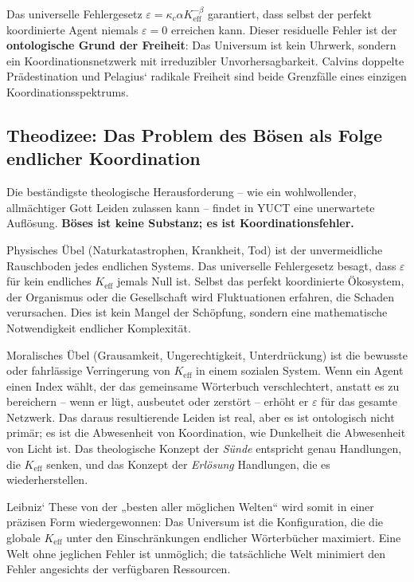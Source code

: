\documentclass[12pt,a4paper]{article}
\begin{document}
	Das universelle Fehlergesetz \(\varepsilon = \kappa_c \alpha K_{\mathrm{eff}}^{-\beta}\) garantiert, dass selbst der perfekt koordinierte Agent niemals \(\varepsilon = 0\) erreichen kann. Dieser residuelle Fehler ist der \textbf{ontologische Grund der Freiheit}: Das Universum ist kein Uhrwerk, sondern ein Koordinationsnetzwerk mit irreduzibler Unvorhersagbarkeit. Calvins doppelte Prädestination und Pelagius‘ radikale Freiheit sind beide Grenzfälle eines einzigen Koordinationsspektrums.
	
	\subsection{Theodizee: Das Problem des Bösen als Folge endlicher Koordination}
	
	Die beständigste theologische Herausforderung – wie ein wohlwollender, allmächtiger Gott Leiden zulassen kann – findet in YUCT eine unerwartete Auflösung. \textbf{Böses ist keine Substanz; es ist Koordinationsfehler.}
	
	Physisches Übel (Naturkatastrophen, Krankheit, Tod) ist der unvermeidliche Rauschboden jedes endlichen Systems. Das universelle Fehlergesetz besagt, dass \(\varepsilon\) für kein endliches \(K_{\mathrm{eff}}\) jemals Null ist. Selbst das perfekt koordinierte Ökosystem, der Organismus oder die Gesellschaft wird Fluktuationen erfahren, die Schaden verursachen. Dies ist kein Mangel der Schöpfung, sondern eine mathematische Notwendigkeit endlicher Komplexität.
	
	Moralisches Übel (Grausamkeit, Ungerechtigkeit, Unterdrückung) ist die bewusste oder fahrlässige Verringerung von \(K_{\mathrm{eff}}\) in einem sozialen System. Wenn ein Agent einen Index wählt, der das gemeinsame Wörterbuch verschlechtert, anstatt es zu bereichern – wenn er lügt, ausbeutet oder zerstört – erhöht er \(\varepsilon\) für das gesamte Netzwerk. Das daraus resultierende Leiden ist real, aber es ist ontologisch nicht primär; es ist die Abwesenheit von Koordination, wie Dunkelheit die Abwesenheit von Licht ist. Das theologische Konzept der \emph{Sünde} entspricht genau Handlungen, die \(K_{\mathrm{eff}}\) senken, und das Konzept der \emph{Erlösung} Handlungen, die es wiederherstellen.
	
	Leibniz‘ These von der „besten aller möglichen Welten“ wird somit in einer präzisen Form wiedergewonnen: Das Universum ist die Konfiguration, die die globale \(K_{\mathrm{eff}}\) unter den Einschränkungen endlicher Wörterbücher maximiert. Eine Welt ohne jeglichen Fehler ist unmöglich; die tatsächliche Welt minimiert den Fehler angesichts der verfügbaren Ressourcen.
	
\end{document}
